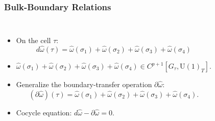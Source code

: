 \documentclass[xcolor=table, 10pt, aspectratio=43]{beamer}
\newcommand{\uone}{\mathrm U(1)}
\begin{document}
\begin{frame}
	\frametitle{Bulk-Boundary Relations}
	\begin{columns}
		\begin{itemize}
			\item On the cell $\tau$:
			\[d\hat\omega(\tau) = \hat\omega(\sigma_1)
			+\hat\omega(\sigma_2)+\hat\omega(\sigma_3)+\hat\omega(\sigma_4)\]
			\item $\hat\omega(\sigma_1)
			+\hat\omega(\sigma_2)+\hat\omega(\sigma_3)+\hat\omega(\sigma_4)\in C^{p+1}[G_\tau,\uone_T]$.
			\item Generalize the boundary-transfer operation $\partial\hat\omega$:
			\[(\partial\hat\omega)(\tau)=\hat\omega(\sigma_1)
			+\hat\omega(\sigma_2)+\hat\omega(\sigma_3)+\hat\omega(\sigma_4).\]
			\item Cocycle equation: $d\hat\omega - \partial\hat\omega=0.$
		\end{itemize}
	\end{columns}
\end{frame}
\end{document}
